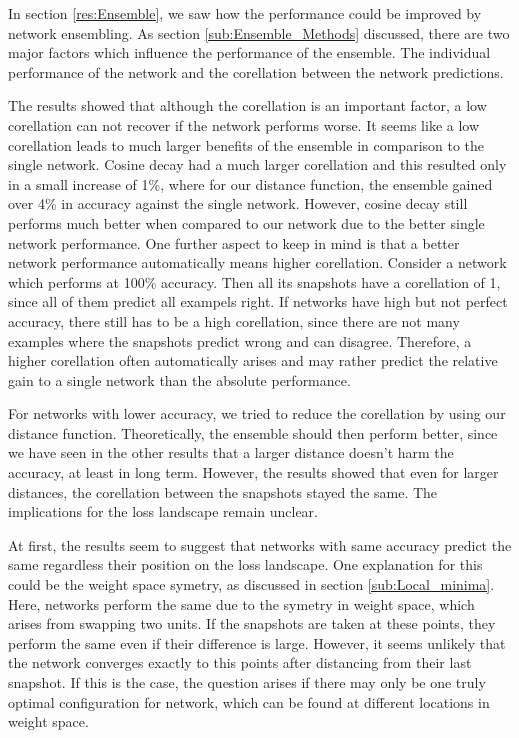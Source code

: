 In section \ref{res:Ensemble}, we saw how the performance could be improved by
network ensembling. As section \ref{sub:Ensemble_Methods} discussed, there are
two major factors which influence the performance of the ensemble. The
individual performance of the network and the corellation between the network
predictions.

The results showed that although the corellation is an important factor, a low
corellation can not recover if the network performs worse. It seems like a low
corellation leads to much larger benefits of the ensemble in comparison to the
single network. Cosine decay had a much larger corellation and this resulted
only in a small increase of 1\%, where for our distance function, the
ensemble gained over 4\% in accuracy against the single network. However, cosine
decay still performs much better when compared to our network due to the better
single network performance. One further aspect to keep in mind is that a better
network performance automatically means higher corellation. Consider a network
which performs at 100\% accuracy. Then all its snapshots have a corellation of
1, since all of them predict all exampels right. If networks have high but not
perfect accuracy, there still has to be a high corellation, since there are not
many examples where the snapshots predict wrong and can disagree. Therefore, a
higher corellation often automatically arises and may rather predict the
relative gain to a single network than the absolute performance.

For networks with lower accuracy, we tried to reduce the corellation by using
our distance function. Theoretically, the ensemble should then perform better,
since we have seen in the other results that a larger distance doesn't harm the
accuracy, at least in long term. However, the results showed that even for
larger distances, the corellation between the snapshots stayed the same. The
implications for the loss landscape remain unclear.

At first, the results seem to suggest that networks with same accuracy predict
the same regardless their position on the loss landscape. One explanation for
this could be the weight space symetry, as discussed in section
\ref{sub:Local_minima}. Here, networks perform the same due to the symetry in
weight space, which arises from swapping two units. If the snapshots are taken
at these points, they perform the same even if their difference is large.
However, it seems unlikely that the network converges exactly to this points
after distancing from their last snapshot. If this is the case, the question
arises if there may only be one truly optimal configuration for network, which
can be found at different locations in weight space.

